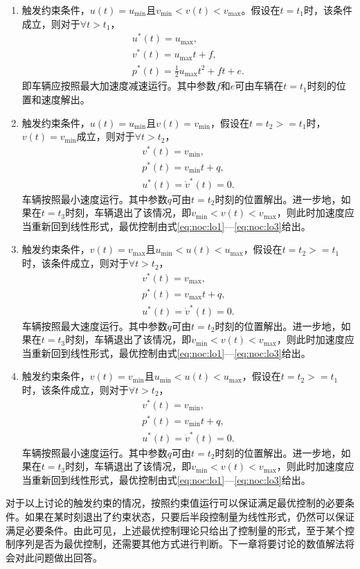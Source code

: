 \begin{enumerate}[label=(\arabic*)]
\item 触发约束条件，$u(t)=u_{\min}$且$v_{\min}<v(t)<v_{\max}$。假设在$t=t_1$时，该条件成立，则对于$\forall t>t_1$，
\begin{gather}
u^*(t)=u_{\max},\\
v^*(t)=u_{\max}t+f,\\
p^*(t)=\frac12u_{\max}t^2+ft+e.
\end{gather}
即车辆应按照最大加速度减速运行。其中参数$f$和$e$可由车辆在$t=t_1$时刻的位置和速度解出。
\item 触发约束条件，$u(t)=u_{\min}$且$v(t)=v_{\min}$，假设在$t=t_2>=t_1$时，$v(t)=v_{\min}$成立，则对于$\forall t>t_2$，
\begin{gather}
v^*(t)=v_{\min},\\
p^*(t)=v_{\min}t+q,\\
u^*(t)=\dot{v}^*(t)=0.
\end{gather}
车辆按照最小速度运行。其中参数$q$可由$t=t_2$时刻的位置解出。进一步地，如果在$t=t_3$时刻，车辆退出了该情况，即$v_{\min}<v(t)<v_{\max}$，则此时加速度应当重新回到线性形式，最优控制由式\eqref{eq:noc:lo1}---\eqref{eq:noc:lo3}给出。
\item 触发约束条件，$v(t)=v_{\max}$且$u_{\min}<u(t)<u_{\max}$，假设在$t=t_2>=t_1$时，该条件成立，则对于$\forall t>t_2$，
\begin{gather}
v^*(t)=v_{\max},\\
p^*(t)=v_{\max}t+q,\\
u^*(t)=\dot{v}^*(t)=0.
\end{gather}
车辆按照最大速度运行。其中参数$q$可由$t=t_2$时刻的位置解出。进一步地，如果在$t=t_3$时刻，车辆退出了该情况，即$v_{\min}<v(t)<v_{\max}$，则此时加速度应当重新回到线性形式，最优控制由式\eqref{eq:noc:lo1}---\eqref{eq:noc:lo3}给出。
\item 触发约束条件，$v(t)=v_{\min}$且$u_{\min}<u(t)<u_{\max}$，假设在$t=t_2>=t_1$时，该条件成立，则对于$\forall t>t_2$，
\begin{gather}
v^*(t)=v_{\min},\\
p^*(t)=v_{\min}t+q,\\
u^*(t)=\dot{v}^*(t)=0.
\end{gather}
车辆按照最小速度运行。其中参数$q$可由$t=t_2$时刻的位置解出。进一步地，如果在$t=t_3$时刻，车辆退出了该情况，即$v_{\min}<v(t)<v_{\max}$，则此时加速度应当重新回到线性形式，最优控制由式\eqref{eq:noc:lo1}---\eqref{eq:noc:lo3}给出。
\end{enumerate}
\begin{remark}
对于以上讨论的触发约束的情况，按照约束值运行可以保证满足最优控制的必要条件。如果在某时刻退出了约束状态，只要后半段控制量为线性形式，仍然可以保证满足必要条件。由此可见，上述最优控制理论只给出了控制量的形式，至于某个控制序列是否为最优控制，还需要其他方式进行判断。下一章将要讨论的数值解法将会对此问题做出回答。
\end{remark}
